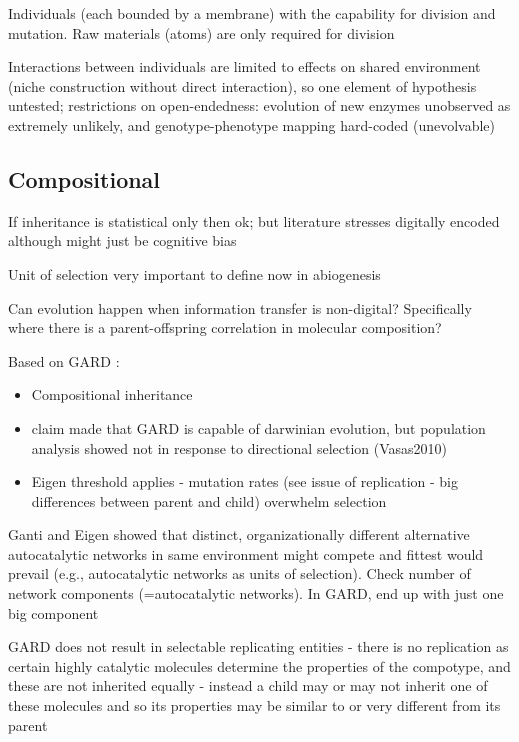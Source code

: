 			
			Individuals (each bounded by a membrane) with the capability for
			division and mutation. Raw materials (atoms) are only required for
			division

			Interactions between individuals are limited to effects on shared
			environment (niche construction without direct interaction), so one
			element of hypothesis untested; restrictions on open-endedness:
			evolution of new enzymes unobserved as extremely unlikely, and
			genotype-phenotype mapping hard-coded (unevolvable)

	
\subsection{Compositional}
		
\autocite{Vasas2015, Vasas2012, Vasas2012a}

If inheritance is statistical only then ok; but literature
stresses digitally encoded although might just be cognitive bias

Unit of selection very important to define now in abiogenesis

Can evolution happen when information transfer is non-digital?
Specifically where there is a parent-offspring correlation in
molecular composition?

Based on GARD \autocite{Segre1998}:
			
\begin{itemize}
	\item Compositional inheritance
	
	\item claim made that GARD is capable of darwinian evolution, but
	population analysis showed not in response to directional selection
	(Vasas2010)
	
	\item Eigen threshold applies - mutation rates (see issue of replication -
	big differences between parent and child) overwhelm selection
\end{itemize}

Ganti and Eigen showed that distinct, organizationally different
alternative autocatalytic networks in same environment might compete
and fittest would prevail (e.g., autocatalytic networks as units of
selection).	Check number of network components (=autocatalytic networks). In GARD, end up with just one big component

GARD does not result in selectable replicating entities - there is no
replication as certain highly catalytic molecules determine the
properties of the compotype, and these are not inherited equally -
instead a child may or may not inherit one of these molecules and so
its properties may be similar to or very different from its parent
		
